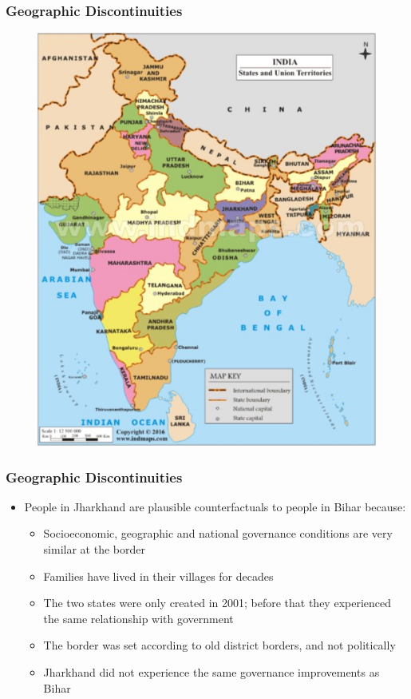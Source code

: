 \documentclass[xcolor=x11names,compress]{beamer}\usepackage[]{graphicx}\usepackage[]{color}
\renewcommand{\(}{\begin{columns}}
\renewcommand{\)}{\end{columns}}
\newcommand{\<}[1]{\begin{column}{#1}}
\renewcommand{\>}{\end{column}}
\begin{document}
\begin{frame}
\frametitle{Geographic Discontinuities}
\begin{figure}
\includegraphics[scale=0.2]{figure/India_Map.jpg} 
\end{figure}
\end{frame}

\begin{frame}
\frametitle{Geographic Discontinuities}
\begin{itemize}
\item People in Jharkhand are plausible counterfactuals to people in Bihar because:
\pause
\begin{itemize}
\item Socioeconomic, geographic and national governance conditions are very similar at the border
\pause
\item Families have lived in their villages for decades
\pause
\item The two states were only created in 2001; before that they experienced the same relationship with government
\pause
\item The border was set according to old district borders, and not politically
\pause
\item Jharkhand did not experience the same governance improvements as Bihar
\end{itemize}
\end{itemize}
\end{frame}
\end{document}
